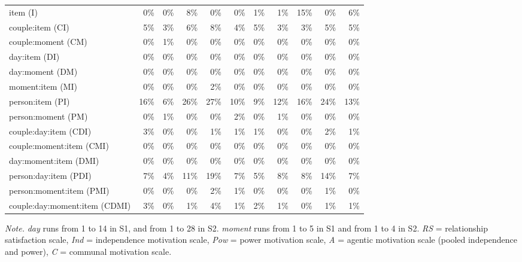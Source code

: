 \documentclass[jou,a4paper,draftfirst]{apa6}\usepackage[]{graphicx}\usepackage[]{color}
\begin{document}
\begin{table*}
\begin{threeparttable}
\begin{tabular}{lrrrrrrrrrr}
 item (I) & 0\% & 0\% & 8\% & 0\% & 0\% & 1\% & 1\% & 15\% & 0\% & 6\% \\ 
  couple:item (CI) & 5\% & 3\% & 6\% & 8\% & 4\% & 5\% & 3\% & 3\% & 5\% & 5\% \\ 
  couple:moment (CM) & 0\% & 1\% & 0\% & 0\% & 0\% & 0\% & 0\% & 0\% & 0\% & 0\% \\ 
  day:item (DI) & 0\% & 0\% & 0\% & 0\% & 0\% & 0\% & 0\% & 0\% & 0\% & 0\% \\ 
  day:moment (DM) & 0\% & 0\% & 0\% & 0\% & 0\% & 0\% & 0\% & 0\% & 0\% & 0\% \\ 
  moment:item (MI) & 0\% & 0\% & 0\% & 2\% & 0\% & 0\% & 0\% & 0\% & 0\% & 0\% \\ 
  person:item (PI) & 16\% & 6\% & 26\% & 27\% & 10\% & 9\% & 12\% & 16\% & 24\% & 13\% \\ 
  person:moment (PM) & 0\% & 1\% & 0\% & 0\% & 2\% & 0\% & 1\% & 0\% & 0\% & 0\% \\ 
  couple:day:item (CDI) & 3\% & 0\% & 0\% & 1\% & 1\% & 1\% & 0\% & 0\% & 2\% & 1\% \\ 
  couple:moment:item (CMI) & 0\% & 0\% & 0\% & 0\% & 0\% & 0\% & 0\% & 0\% & 0\% & 0\% \\ 
  day:moment:item (DMI) & 0\% & 0\% & 0\% & 0\% & 0\% & 0\% & 0\% & 0\% & 0\% & 0\% \\ 
  person:day:item (PDI) & 7\% & 4\% & 11\% & 19\% & 7\% & 5\% & 8\% & 8\% & 14\% & 7\% \\ 
  person:moment:item (PMI) & 0\% & 0\% & 0\% & 2\% & 1\% & 0\% & 0\% & 0\% & 1\% & 0\% \\ 
  couple:day:moment:item (CDMI) & 3\% & 0\% & 1\% & 4\% & 1\% & 2\% & 1\% & 0\% & 1\% & 1\% \\ 
  
			
			\midrule
		\end{tabular}
		\begin{tablenotes}[para,flushleft]
			{\small
			\textit{Note.} \emph{day} runs from 1 to 14 in S1, and from 1 to 28 in S2. \emph{moment} runs from 1 to 5 in S1 and from 1 to 4 in S2. \emph{RS} = relationship satisfaction scale, \emph{Ind} = independence motivation scale, \emph{Pow} = power motivation scale, \emph{A} = agentic motivation scale (pooled independence and power), \emph{C} = communal motivation scale.}
	      \end{tablenotes}
	  \end{threeparttable}
\end{table*}			
\end{document}
